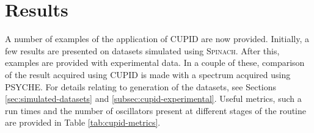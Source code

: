 \section{Results}
\label{subsec:cupid-results}
A number of examples of the application of \ac{CUPID} are now provided.
Initially, a few results are presented on datasets simulated using
\textsc{Spinach}. After this, examples are provided with experimental data. In
a couple of these, comparison of the result acquired using \ac{CUPID} is
made with a spectrum acquired using \ac{PSYCHE}. For details relating to
generation of the datasets, see Sections \ref{sec:simulated-datasets} and
\ref{subsec:cupid-experimental}. Useful metrics, such a run
times and the number of oscillators present at different stages of the routine
are provided in Table \ref{tab:cupid-metrics}.

